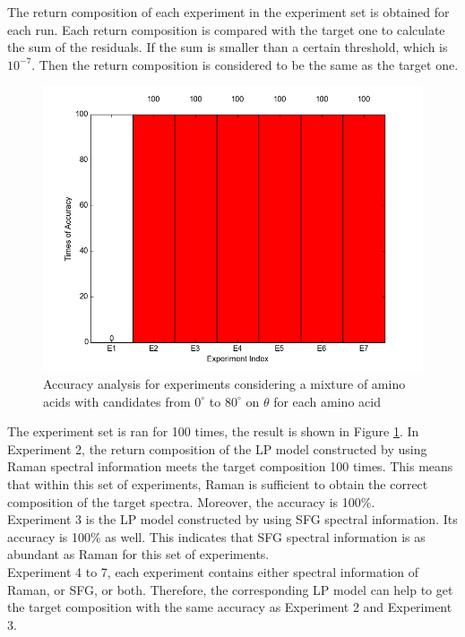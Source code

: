 The return composition of each experiment in the experiment set is obtained for each run. Each return composition is compared with the target one to calculate the sum of the residuals. If the sum is smaller than a certain threshold, which is $10^{-7}$. Then the return composition is considered to be the same as the target one. \\

\begin{figure}[!ht]
\centering
\includegraphics[scale=0.7]{Figures/accuracy_pecent_result8_mixture.png}
\caption{Accuracy analysis for experiments considering a mixture of amino acids with candidates from $0^{\circ}$ to $80^{\circ}$ on $\theta$ for each amino acid}  \label{fig:5.1}
\end{figure}

The experiment set is ran for 100 times, the result is shown in 
Figure \ref{fig:5.1}. In Experiment 2, the return composition of the LP model constructed by using Raman spectral information meets the target composition 100 times. This means that within this set of experiments, Raman is sufficient to obtain the correct composition of the target spectra. Moreover, the accuracy is 100\%. \\

Experiment 3 is the LP model constructed by using SFG spectral information. Its accuracy is 100\% as well. This indicates that SFG spectral information is as abundant as Raman for this set of experiments. \\

Experiment 4 to 7, each experiment contains either spectral information of Raman, or SFG, or both. Therefore, the corresponding LP model can help to get the target composition with the same accuracy as Experiment 2 and Experiment 3. \\

